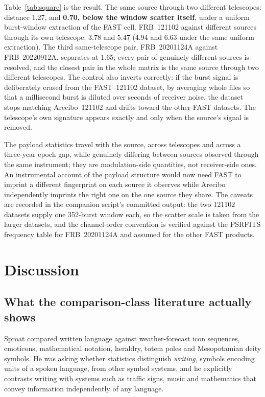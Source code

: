 \documentclass[11pt,a4paper]{article}
\begin{document}
Table~\ref{tab:square} is the result. The same source through two different
telescopes: distance 1.27, and \textbf{0.70, below the window scatter itself}, under a
uniform burst-window extraction of the FAST cell. FRB~121102 against different
sources through its own telescope: 3.78 and 5.47 (4.94 and 6.63 under the same
uniform extraction). The third same-telescope pair, FRB~20201124A against
FRB~20220912A, separates at 1.65; every pair of genuinely different sources is
resolved, and the closest pair in the whole matrix is the same source through two
different telescopes. The
control also inverts correctly: if the burst signal is deliberately erased from the
FAST~121102 dataset, by averaging whole files so that a millisecond burst is diluted
over seconds of receiver noise, the dataset stops matching Arecibo~121102 and drifts
toward the other FAST datasets. The telescope's own signature appears exactly and
only when the source's signal is removed.

The payload statistics travel with the source, across telescopes and across a
three-year epoch gap, while genuinely differing between sources observed through the
same instrument; they are modulation-side quantities, not receiver-side ones. An
instrumental account of the payload structure would now need FAST to imprint a
different fingerprint on each source it observes while Arecibo independently imprints
the right one on the one source they share. The caveats are recorded in the companion
script's committed output: the two 121102 datasets supply one 352-burst window each,
so the scatter scale is taken from the larger datasets, and the channel-order
convention is verified against the PSRFITS frequency table for FRB~20201124A and
assumed for the other FAST products.

\section{Discussion}

\subsection{What the comparison-class literature actually shows}

Sproat \cite{sproat2014} compared written language against weather-forecast icon
sequences, emoticons, mathematical notation, heraldry, totem poles and Mesopotamian
deity symbols. He was asking whether statistics distinguish \emph{writing}, symbols
encoding units of a spoken language, from other symbol systems, and he explicitly
contrasts writing with systems such as traffic signs, music and mathematics that convey
information independently of any language.
\end{document}
